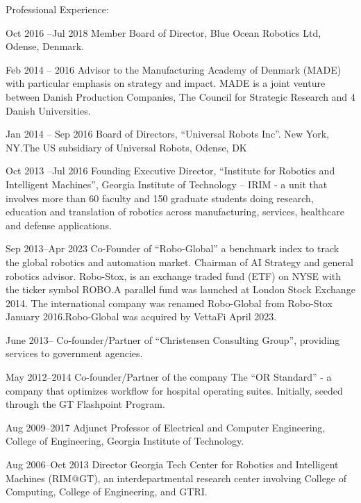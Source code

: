 \documentclass{article}
\begin{document}
\begin{cv}
\begin{cvlist}{Professional Experience:}
\item[Oct 2016 --Jul 2018] Member Board of Director, Blue Ocean Robotics Ltd,
  Odense, Denmark.

\item[Feb 2014 -- 2016] Advisor to the Manufacturing Academy of
  Denmark (MADE) with particular emphasis on strategy and impact. MADE
  is a joint venture between Danish Production Companies, The Council
  for Strategic Research and 4 Danish Universities.

\item[Jan 2014 -- Sep 2016] Board of Directors, ``Universal Robots
  Inc''. New York, NY.\@ The US subsidiary of Universal Robots, Odense,
  DK

\item[Oct 2013 --Jul 2016] Founding Executive Director, ``Institute
  for Robotics and Intelligent Machines'', Georgia Institute of
  Technology -- IRIM - a unit that involves more than 60 faculty and
  150 graduate students doing research, education and translation of
  robotics across manufacturing, services, healthcare and defense
  applications.

\item[Sep 2013--Apr 2023] Co-Founder of ``Robo-Global'' a benchmark index to
  track the global robotics and automation market. Chairman of AI Strategy and
  general robotics advisor. Robo-Stox, is an exchange traded fund (ETF) on NYSE
  with the ticker symbol ROBO.\@ A parallel fund was launched at London Stock
  Exchange 2014. The international company was renamed Robo-Global from
  Robo-Stox January 2016.\@ Robo-Global was acquired by VettaFi April 2023.

\item[June 2013--] Co-founder/Partner of  ``Christensen
  Consulting Group'', providing services to government agencies.

\item[May 2012--2014] Co-founder/Partner of the company The ``OR
  Standard'' - a company that optimizes workflow for hospital
  operating suites. Initially, seeded through the GT Flashpoint
  Program.

\item[Aug 2009--2017] Adjunct Professor of Electrical and Computer
  Engineering, College of Engineering, Georgia Institute of
  Technology.

\item[Aug 2006--Oct 2013] Director Georgia Tech Center for Robotics and
  Intelligent Machines (RIM@GT), an interdepartmental research center
  involving College of Computing, College of Engineering, and GTRI.


\end{cvlist}
\end{cv}
\end{document}
